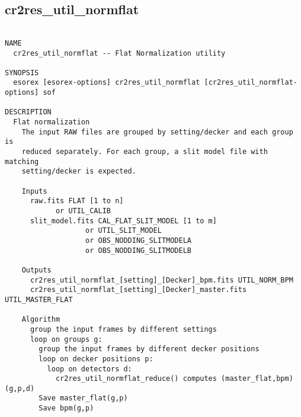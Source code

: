 \subsection{cr2res\_util\_normflat}
\begin{verbatim}

NAME
  cr2res_util_normflat -- Flat Normalization utility

SYNOPSIS
  esorex [esorex-options] cr2res_util_normflat [cr2res_util_normflat-options] sof

DESCRIPTION
  Flat normalization                                                      
    The input RAW files are grouped by setting/decker and each group is   
    reduced separately. For each group, a slit model file with matching   
    setting/decker is expected.                                           
                                                                          
    Inputs                                                                
      raw.fits FLAT [1 to n]                               
            or UTIL_CALIB                              
      slit_model.fits CAL_FLAT_SLIT_MODEL [1 to m]     
                   or UTIL_SLIT_MODEL                  
                   or OBS_NODDING_SLITMODELA           
                   or OBS_NODDING_SLITMODELB           
                                                                          
    Outputs                                                               
      cr2res_util_normflat_[setting]_[Decker]_bpm.fits UTIL_NORM_BPM
      cr2res_util_normflat_[setting]_[Decker]_master.fits UTIL_MASTER_FLAT
                                                                          
    Algorithm                                                             
      group the input frames by different settings                        
      loop on groups g:                                                   
        group the input frames by different decker positions              
        loop on decker positions p:                                       
          loop on detectors d:                                            
            cr2res_util_normflat_reduce() computes (master_flat,bpm)(g,p,d)
        Save master_flat(g,p)                                             
        Save bpm(g,p)                                                     
                                                                          

\end{verbatim}
